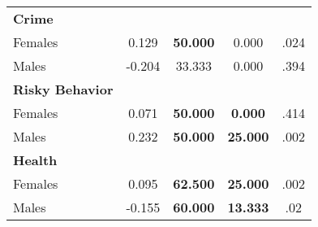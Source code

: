 \begin{tabular}{l c c c c}
\midrule
\textbf{Crime} & & & & \\
\quad Females &      0.129 & \textbf{   50.000} &     0.000 & .024 \\
\quad Males &     -0.204 &    33.333 &     0.000 & .394 \\
\midrule
\textbf{Risky Behavior} & & & & \\
\quad Females &      0.071 & \textbf{   50.000} & \textbf{    0.000} & .414 \\
\quad Males &      0.232 & \textbf{   50.000} & \textbf{   25.000} & .002 \\
\midrule
\textbf{Health} & & & & \\
\quad Females &      0.095 & \textbf{   62.500} & \textbf{   25.000} & .002 \\
\quad Males &     -0.155 & \textbf{   60.000} & \textbf{   13.333} & .02 \\
\midrule
\bottomrule
\end{tabular}

